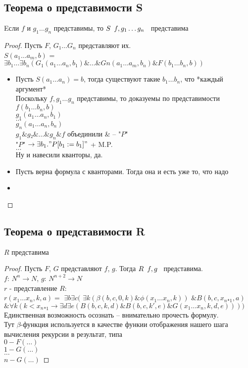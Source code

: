 \subsection{Теорема о представимости S}
\label{sec-11-5}
\begin{lemma}
Eсли $f$ и $g_1 \dots g_n$ представимы, то $S\template{f, g_1 \dots g_n}$ представима
\end{lemma}
\begin{proof}
Пусть $F$, $G_1 \dots G_n$ представляют их.\\
$S(a_1 \dots a_m, b)$ = $\exists b_1 \dots \exists b_n(G_1(a_1\dots a_n, b_1) \& \dots \& Gn(a_1 \dots a_m, b_n) \& F(b_1\dots b_n, b))$
\begin{itemize}
\item Пусть $S(a_1 \dots a_n) = b$, тогда существуют такие $b_1 \dots b_n$, что *каждый аргумент*\\
Поскольку $f, g_1 \dots g_n$ представимы, то доказуемы по представимости\\
$f(b_1 \dots b_n, b)$\\
$g_1(a_1 \dots a_n, b_1)$\\
$\dots$\\
$g_n(a_1 \dots a_n, b_n)$\\
$g_1 \& g₂ \& \dots  \& g_n \& f$ объединили \& -- "$P$"\\
"$P$" $\to \exists b_1."P[b_1:=b_1]"$ + M.P.\\
$\dots$\\
Ну и навесили кванторы, да.
\item Пусть верна формула с кванторами. Тогда она и есть уже то, что надо
\item {}
\end{itemize}
\end{proof}
\subsection{Теорема о представимости R}
\label{sec-11-6}
\begin{theorem}
$R$ представима
\end{theorem}
\begin{proof}
Пусть $F$, $G$ представляют $f$, $g$. Тогда $R\template{f, g}$ представима.\\
$f$: $N^n \to N$, $g$: $N^{n+2} \to N$\\
$r$ - представление $R$:\\
$r(x_1 \dots x_n, k, a) =$
   $\exists b\exists c($
        $\exists k(\beta(b, c, 0, k) \& \phi(x_1\dots x_n, k))$
        $\& B(b, c, x_n₊_1, a)$\\
        $\& \forall k(k<x_n₊_1 \to \exists d\exists e(B(b,c,k,d)\&B(b,c,k',e)\&G(x_1\dots x_n,k,d,e))))$\\
Единственная возможность осознать -- внимательно прочесть формулу.\\
Тут $\beta$-функция используется в качестве функии отображения нашего шага вычисления рекурсии в результат, типа\\
$0 - F(\dots )$\\
$1 - G(\dots )$\\
$\dots $\\
$n - G(\dots )$
\end{proof}
